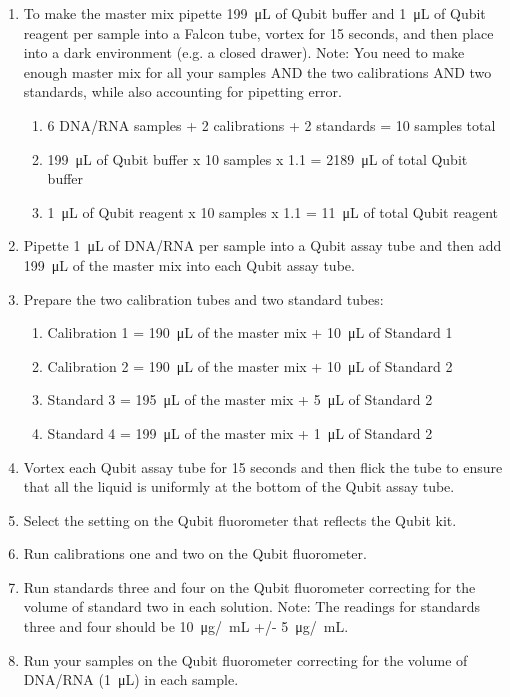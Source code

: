 \documentclass[a4paper,12pt]{article}
\begin{document}
\begin{enumerate}

\item To make the master mix pipette \SI{199}{\micro\liter} of Qubit buffer and \SI{1}{\micro\liter} of Qubit reagent per sample into a Falcon tube, vortex for 15 seconds, and then place into a dark environment (e.g. a closed drawer). Note: You need to make enough master mix for all your samples AND the two calibrations AND two standards, while also accounting for pipetting error. 
\begin{enumerate}
\item 6 DNA/RNA samples + 2 calibrations + 2 standards = 10 samples total
\item \SI{199}{\micro\liter} of Qubit buffer x 10 samples x 1.1 = \SI{2189}{\micro\liter} of total Qubit buffer
\item \SI{1}{\micro\liter} of Qubit reagent x 10 samples x 1.1 = \SI{11}{\micro\liter} of total Qubit reagent 
\end{enumerate}
\item Pipette \SI{1}{\micro\liter} of DNA/RNA per sample into a Qubit assay tube and then add \SI{199}{\micro\liter} of the master mix into each Qubit assay tube. 
\item Prepare the two calibration tubes and two standard tubes:
\begin{enumerate}
\item Calibration 1 = \SI{190}{\micro\liter} of the master mix + \SI{10}{\micro\liter} of Standard 1
\item Calibration 2 = \SI{190}{\micro\liter} of the master mix + \SI{10}{\micro\liter} of Standard 2
\item Standard 3 = \SI{195}{\micro\liter} of the master mix + \SI{5}{\micro\liter} of Standard 2
\item Standard 4 = \SI{199}{\micro\liter} of the master mix + \SI{1}{\micro\liter} of Standard 2
\end{enumerate}
\item Vortex each Qubit assay tube for 15 seconds and then flick the tube to ensure that all the liquid is uniformly at the bottom of the Qubit assay tube. 
\item Select the setting on the Qubit fluorometer that reflects the Qubit kit.
\item Run calibrations one and two on the Qubit fluorometer. 
\item Run standards three and four on the Qubit fluorometer correcting for the volume of standard two in each solution. Note: The readings for standards three and four should be \SI{10}{\micro\gram}/\SI{}{\milli\liter} +/- \SI{5}{\micro\gram}/\SI{}{\milli\liter}.
\item Run your samples on the Qubit fluorometer correcting for the volume of DNA/RNA (\SI{1}{\micro\liter}) in each sample.
\end{enumerate}
\end{document}
